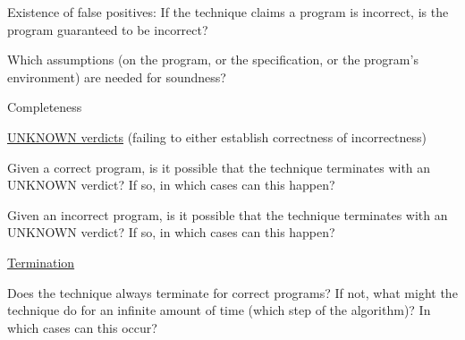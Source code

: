 \documentclass[a4paper]{article}
\begin{document}
\begin{minipage}[t]{0.16\linewidth}
\begin{betterlist}
\begin{betterlist}
\begin{betterlist}
				\item Existence of false positives: If the technique claims a program is incorrect, is the program guaranteed to be incorrect?

			\end{betterlist}
			\item Which assumptions (on the program, or the specification, or the program’s environment) are needed for soundness?
		\end{betterlist}
		\item \alert{Completeness}
		\begin{betterlist}
			\item \underline{UNKNOWN verdicts} (failing to either establish correctness of incorrectness)
			\begin{betterlist}
				\item Given a correct program, is it possible that the technique terminates with an UNKNOWN verdict? If so, in which cases can this happen?

				\item Given an incorrect program, is it possible that the technique terminates with an UNKNOWN verdict? If so, in which cases can this happen?

			\end{betterlist}
			\item \underline{Termination}
			\begin{betterlist}
				\item Does the technique always terminate for correct programs? If not, what might the technique do for an infinite amount of time (which step of the algorithm)? In which cases can this occur?


\end{betterlist}
\end{betterlist}
\end{betterlist}
\end{minipage}
\end{document}
